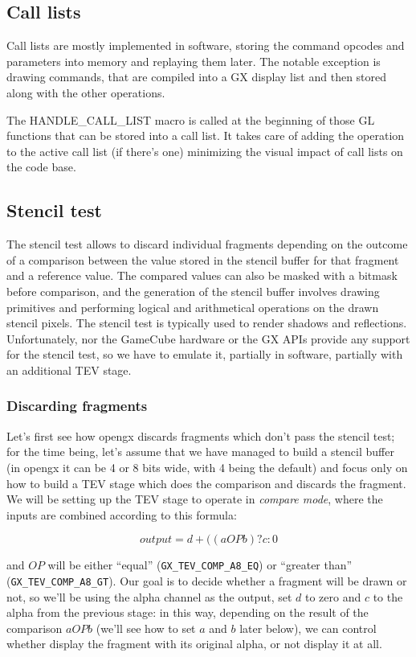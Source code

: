 \documentclass[12pt]{article}
\begin{document}
\subsection {Call lists}

Call lists are mostly implemented in software, storing the command opcodes and parameters into memory and replaying them later. The notable exception is drawing commands, that are compiled into a GX display list and then stored along with the other operations.

The HANDLE\_CALL\_LIST macro is called at the beginning of those GL functions that can be stored into a call list. It takes care of adding the operation to the active call list (if there's one) minimizing the visual impact of call lists on the code base.


\subsection {Stencil test}

The stencil test allows to discard individual fragments depending on the outcome of a comparison between the value stored in the stencil buffer for that fragment and a reference value. The compared values can also be masked with a bitmask before comparison, and the generation of the stencil buffer involves drawing primitives and performing logical and arithmetical operations on the drawn stencil pixels. The stencil test is typically used to render shadows and reflections. Unfortunately, nor the GameCube hardware or the GX APIs provide any support for the stencil test, so we have to emulate it, partially in software, partially with an additional TEV stage.

\subsubsection {Discarding fragments}
\label{sec:stencildiscard}

Let's first see how opengx discards fragments which don't pass the stencil test; for the time being, let's assume that we have managed to build a stencil buffer (in opengx it can be 4 or 8 bits wide, with 4 being the default) and focus only on how to build a TEV stage which does the comparison and discards the fragment. We will be setting up the TEV stage to operate in \emph{compare mode}, where the inputs are combined according to this formula:

    $$ output = d + ((a OP b) ? c : 0 $$

and $OP$ will be either “equal” (\lstinline{GX_TEV_COMP_A8_EQ}) or “greater than” (\lstinline{GX_TEV_COMP_A8_GT}). Our goal is to decide whether a fragment will be drawn or not, so we'll be using the alpha channel as the output, set $d$ to zero and $c$ to the alpha from the previous stage: in this way, depending on the result of the comparison $a OP b$ (we'll see how to set $a$ and $b$ later below), we can control whether display the fragment with its original alpha, or not display it at all.
\end{document}
